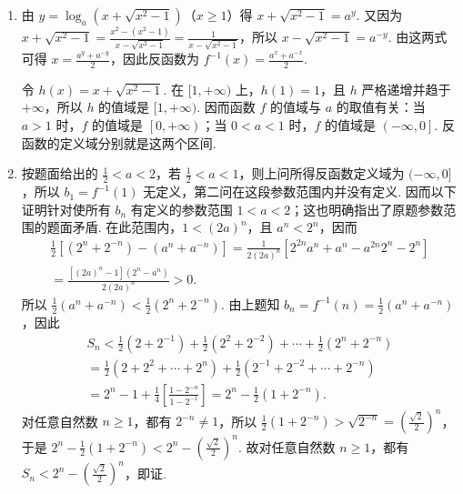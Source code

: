 \documentclass[UTF8,a4paper,oneside,11pt]{ctexbook}
\begin{document}
\begin{solution}
\begin{enumerate}
\item 由 \(y=\log_a\left(x+\sqrt{x^2-1}\right)\)（\(x\geqslant1\)）得 \(x+\sqrt{x^2-1}=a^y\). 又因为
\(x+\sqrt{x^2-1}=\frac{x^2-(x^2-1)}{x-\sqrt{x^2-1}}=\frac{1}{x-\sqrt{x^2-1}}\)，所以 \(x-\sqrt{x^2-1}=a^{-y}\). 由这两式可得 \(x=\frac{a^y+a^{-y}}{2}\)，因此反函数为 \(f^{-1}(x)=\frac{a^x+a^{-x}}{2}\).

令 \(h(x)=x+\sqrt{x^2-1}\). 在 \([1,+\infty)\) 上，\(h(1)=1\)，且 \(h\) 严格递增并趋于 \(+\infty\)，所以 \(h\) 的值域是 \([1,+\infty)\). 因而函数 \(f\) 的值域与 \(a\) 的取值有关：当 \(a>1\) 时，\(f\) 的值域是 \(\left[0,+\infty\right)\)；当 \(0<a<1\) 时，\(f\) 的值域是 \(\left(-\infty,0\right]\). 反函数的定义域分别就是这两个区间.

\item 按题面给出的 \(\frac{1}{2}<a<2\)，若 \(\frac{1}{2}<a<1\)，则上问所得反函数定义域为 \((-\infty,0]\)，所以 \(b_1=f^{-1}(1)\) 无定义，第二问在这段参数范围内并没有定义. 因而以下证明针对使所有 \(b_n\) 有定义的参数范围 \(1<a<2\)；这也明确指出了原题参数范围的题面矛盾. 在此范围内，\(1<(2a)^n\)，且 \(a^n<2^n\)，因而
\[
\begin{gathered}
\frac{1}{2}\left[(2^n+2^{-n})-(a^n+a^{-n})\right]=\frac{1}{2(2a)^n}\left[2^{2n}a^n+a^n-a^{2n}2^n-2^n\right] \\
=\frac{\left[(2a)^n-1\right]\left(2^n-a^n\right)}{2(2a)^n}>0.
\end{gathered}
\]
所以 \(\frac{1}{2}(a^n+a^{-n})<\frac{1}{2}(2^n+2^{-n})\). 由上题知 \(b_n=f^{-1}(n)=\frac{1}{2}(a^n+a^{-n})\)，因此
\[
\begin{gathered}
S_n<\frac{1}{2}(2+2^{-1})+\frac{1}{2}(2^2+2^{-2})+\cdots+\frac{1}{2}(2^n+2^{-n}) \\
=\frac{1}{2}(2+2^2+\cdots+2^n)+\frac{1}{2}(2^{-1}+2^{-2}+\cdots+2^{-n}) \\
=2^n-1+\frac{1}{4}\left[\frac{1-2^{-n}}{1-2^{-1}}\right]=2^n-\frac{1}{2}(1+2^{-n}).
\end{gathered}
\]
对任意自然数 \(n\geqslant1\)，都有 \(2^{-n}\neq1\)，所以 \(\frac{1}{2}(1+2^{-n})>\sqrt{2^{-n}}=\left(\frac{\sqrt{2}}{2}\right)^n\)，于是 \(2^n-\frac{1}{2}(1+2^{-n})<2^n-\left(\frac{\sqrt{2}}{2}\right)^n\). 故对任意自然数 \(n\geqslant1\)，都有 \(S_n<2^n-\left(\frac{\sqrt{2}}{2}\right)^n\)，即证.
\end{enumerate}
\end{solution}

\end{document}
